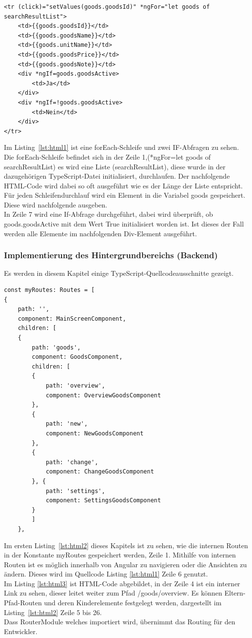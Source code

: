 \lstset{language=html}
\begin{lstlisting}[frame=tb, caption={Schleifen und Abfragen in HTML}, label={lst:html1}]
<tr (click)="setValues(goods.goodsId)" *ngFor="let goods of searchResultList">
	<td>{{goods.goodsId}}</td>
	<td>{{goods.goodsName}}</td>
	<td>{{goods.unitName}}</td>
	<td>{{goods.goodsPrice}}</td>
	<td>{{goods.goodsNote}}</td>
	<div *ngIf=goods.goodsActive>
		<td>Ja</td>
	</div>
	<div *ngIf=!goods.goodsActive>
		<td>Nein</td>
	</div>
</tr>
\end{lstlisting}

Im Listing~\ref{lst:html1} ist eine forEach-Schleife und zwei IF-Abfragen zu sehen. 
Die forEach-Schleife befindet sich in der Zeile 1,(*ngFor=\grqq{}let goods of searchResultList) es wird eine Liste (searchResultList), diese wurde in der dazugehörigen TypeScript-Datei initialisiert, durchlaufen. Der nachfolgende HTML-Code wird dabei so oft ausgeführt wie es der Länge der Liste entspricht. Für jeden Schleifendurchlauf wird ein Element in die Variabel goods gespeichert. Diese wird nachfolgende ausgeben. 
\\
In Zeile 7 wird eine If-Abfrage durchgeführt, dabei wird überprüft, ob goods.goodsActive mit dem Wert True initialisiert worden ist. Ist dieses der Fall werden alle Elemente im nachfolgenden Div-Element ausgeführt.

\subsubsection{Implementierung des Hintergrundbereichs (Backend)}

Es werden in diesem Kapitel einige TypeScript-Quellcodeausschnitte gezeigt.

\lstset{language=java}
\begin{lstlisting}[frame=tb, caption={Festlegung der internen Routen in Angular}, label={lst:html2}]
const myRoutes: Routes = [
{
	path: '',
	component: MainScreenComponent,
	children: [
	{
		path: 'goods',
		component: GoodsComponent,
		children: [
		{
			path: 'overview',
			component: OverviewGoodsComponent
		},
		{
			path: 'new',
			component: NewGoodsComponent
		},
		{
			path: 'change',
			component: ChangeGoodsComponent
		}, {
			path: 'settings',
			component: SettingsGoodsComponent
		}
		]
	},	
\end{lstlisting}

Im ersten Listing~\ref{lst:html2} dieses Kapitels ist zu sehen, wie die internen Routen in der Konstante myRoutes gespeichert werden, Zeile 1. Mithilfe von internen Routen ist es möglich innerhalb von Angular zu navigieren oder die Ansichten zu ändern. Dieses wird im Quellcode Listing \ref{lst:html1} Zeile 6 genutzt. 
\\
Im Listing \ref{lst:html3} ist HTML-Code abgebildet, in der Zeile 4 ist ein interner Link zu sehen, dieser leitet weiter zum Pfad /goods/overview. Es können Eltern-Pfad-Routen und deren Kinderelemente festgelegt werden, dargestellt im Listing~\ref{lst:html2} Zeile 5 bis 26.
\\
Dass RouterModule welches importiert wird, übernimmt das Routing für den Entwickler.

